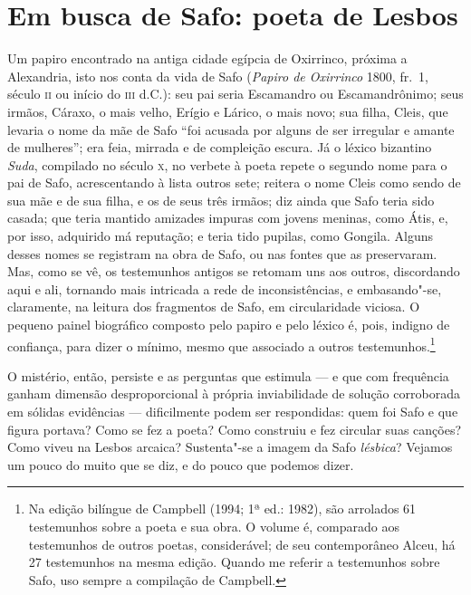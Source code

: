 \section*{Em busca de Safo: poeta de Lesbos}

Um papiro encontrado na antiga cidade egípcia de Oxirrinco, próxima a 			\EP[]
Alexandria, isto nos conta da vida de Safo (\textit{Papiro de Oxirrinco} 1800,
fr.~1, século \textsc{ii} ou início do \textsc{iii} d.C.): seu pai seria Escamandro ou
Escamandrônimo; seus irmãos, Cáraxo, o mais velho, Erígio e Lárico, o mais
novo; sua filha, Cleis, que levaria o nome da mãe de Safo ``foi acusada
por alguns de ser irregular e amante de mulheres”; era feia, mirrada e de
compleição escura. Já o léxico bizantino \textit{Suda}, compilado no século \textsc{x},
no verbete à poeta repete o segundo nome para o pai de Safo, acrescentando à
lista outros sete; reitera o nome Cleis como sendo de sua mãe e de sua filha, e
os de seus três irmãos; diz ainda que Safo teria sido casada; que teria mantido
amizades impuras com jovens meninas, como Átis, e, por isso, adquirido má
reputação; e teria tido pupilas, como Gongila. Alguns desses nomes se registram
na obra de Safo, ou nas fontes que as preservaram. Mas, como se vê, os
testemunhos antigos se retomam uns aos outros, discordando aqui e ali, tornando
mais intricada a rede de inconsistências, e embasando"-se, claramente, na
leitura dos fragmentos de Safo, em circularidade viciosa. O pequeno painel
biográfico composto pelo papiro e pelo léxico é, pois, indigno de confiança,
para dizer o mínimo, mesmo que associado a outros testemunhos.\footnote{ Na
edição bilíngue de Campbell (1994; 1ª ed.: 1982), são arrolados 61 testemunhos
sobre a poeta e sua obra. O volume é, \mbox{comparado} aos testemunhos de outros
poetas, considerável; de seu contemporâneo Alceu, há 27 testemunhos na mesma edição. 
Quando me referir a testemunhos sobre Safo, uso
sempre a compilação de Campbell.}

O mistério, então, persiste e as perguntas que estimula --- e que com frequência
ganham dimensão desproporcional à própria inviabilidade de solução
corroborada em sólidas evidências --- dificilmente podem ser respondidas: quem
foi Safo e que figura portava? Como se fez a poeta? Como construiu e fez
circular suas canções? Como viveu na Lesbos arcaica? Sustenta"-se a imagem da
Safo \textit{lésbica}? Vejamos um pouco do muito que se diz, e do
pouco que podemos dizer.

